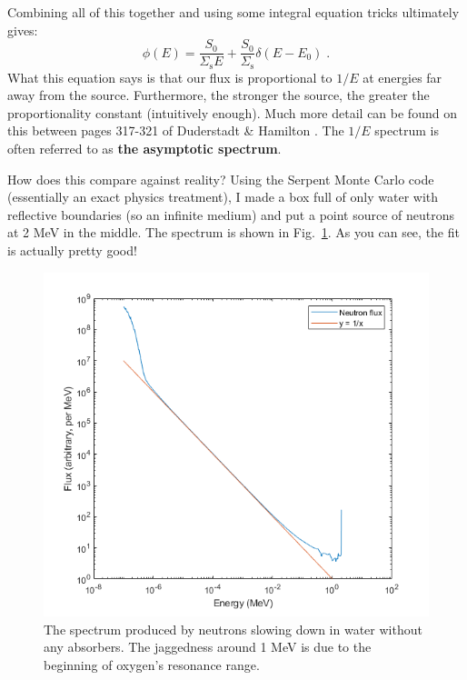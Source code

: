 \documentclass{article}
\begin{document}
Combining all of this together and using some integral equation tricks ultimately gives:
\begin{equation}
    \phi(E) = \frac{S_0}{\Sigma_\mathrm{s}E} + \frac{S_0}{\Sigma_\mathrm{s}}\delta(E-E_0)\;\mathrm{.}
\end{equation}
What this equation says is that our flux is proportional to $1/E$ at energies far away from the source. Furthermore, the stronger the source, the greater the proportionality constant (intuitively enough). Much more detail can be found on this between pages 317-321 of Duderstadt \& Hamilton \cite{Duderstadt}. The $1/E$ spectrum is often referred to as \textbf{the asymptotic spectrum}.

How does this compare against reality? Using the Serpent Monte Carlo code (essentially an exact physics treatment), I made a box full of only water with reflective boundaries (so an infinite medium) and put a point source of neutrons at 2 MeV in the middle. The spectrum is shown in Fig.~\ref{fig:1_E}. As you can see, the fit is actually pretty good!

\begin{figure}[h!]
	\centering
	\includegraphics[scale=0.9]{./images/asymptotic_flux.png} 
	\caption{The spectrum produced by neutrons slowing down in water without any absorbers. The jaggedness around 1 MeV is due to the beginning of oxygen's resonance range.} 
	\label{fig:1_E}
\end{figure}
\end{document}
